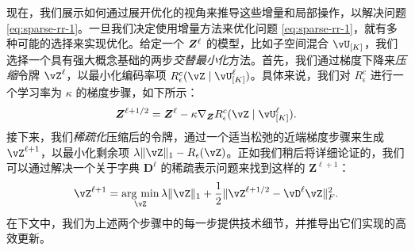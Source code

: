 \documentclass[../../book-main_zh.tex]{subfiles}
\begin{document}
现在，我们展示如何通过展开优化的视角来推导这些增量和局部操作，以解决问题 \eqref{eq:sparse-rr-1}。一旦我们决定使用增量方法来优化问题 \eqref{eq:sparse-rr-1}，就有多种可能的选择来实现优化。给定一个 $\bm{Z}^\ell$ 的模型，比如子空间混合 $\vU_{[K]}$，我们选择一个具有强大概念基础的两步\textit{交替最小化}方法。首先，我们通过梯度下降来\textit{压缩}令牌 $\vZ^{\ell}$，以最小化编码率项 $R^c_\epsilon (\vZ \mid \vU_{[K]}^\ell)$。具体来说，我们对 $R^c_\epsilon$ 进行一个学习率为 $\kappa$ 的梯度步骤，如下所示：
\begin{align}\label{eq:Z l+1/2}
    \bm Z^{\ell+1/2} = \bm Z^\ell - \kappa \nabla_{\bm Z} R^c_\epsilon (\vZ \mid \vU_{[K]}^\ell).
\end{align}
接下来，我们\textit{稀疏化}压缩后的令牌，通过一个适当松弛的近端梯度步骤来生成 \(\vZ^{\ell + 1}\)，以最小化剩余项 $\lambda \norm{\vZ}_{1} - R_{\epsilon}(\vZ)$。正如我们稍后将详细论证的，我们可以通过解决一个关于字典 $\bm D^\ell$ 的稀疏表示问题来找到这样的 $\bm Z^{\ell+1}$：
\begin{equation}\label{eq:Z l+1}
  \vZ^{\ell+1} = \argmin_{{\vZ}}  \lambda \norm{\vZ}_1 + \frac{1}{2}\norm{\vZ^{\ell + 1/2} - \vD^{\ell} {\vZ}}_F^2.
\end{equation}
在下文中，我们为上述两个步骤中的每一步提供技术细节，并推导出它们实现的高效更新。
\end{document}
